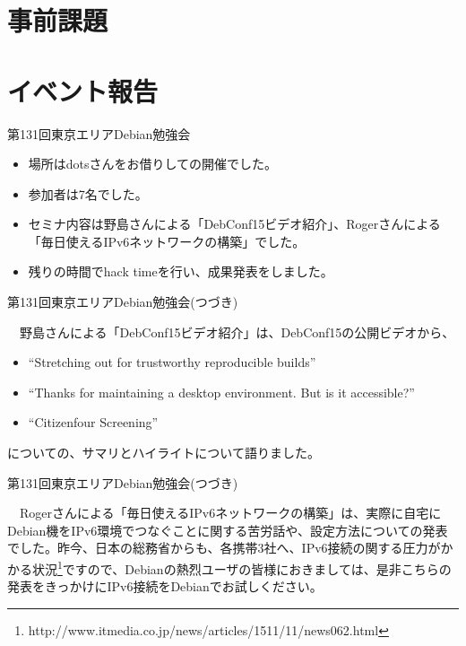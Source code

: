 \section{事前課題}
{\footnotesize
 
}

\section{イベント報告}

\begin{frame}{第131回東京エリアDebian勉強会 }

\begin{itemize}
\item 場所はdotsさんをお借りしての開催でした。
\item 参加者は7名でした。
\item セミナ内容は野島さんによる「DebConf15ビデオ紹介」、Rogerさんによる「毎日使えるIPv6ネットワークの構築」でした。
\item 残りの時間でhack timeを行い、成果発表をしました。
\end{itemize} 
\end{frame}

\begin{frame}{第131回東京エリアDebian勉強会(つづき)}

　野島さんによる「DebConf15ビデオ紹介」は、DebConf15の公開ビデオから、
\begin{itemize}
  \item ``Stretching out for trustworthy reproducible builds''
  \item ``Thanks for maintaining a desktop environment. But is it accessible?''
  \item ``Citizenfour Screening''
\end{itemize}
についての、サマリとハイライトについて語りました。

\end{frame}

\begin{frame}{第131回東京エリアDebian勉強会(つづき)}

 　Rogerさんによる「毎日使えるIPv6ネットワークの構築」は、実際に自宅にDebian機をIPv6環境でつなぐことに関する苦労話や、設定方法についての発表でした。昨今、日本の総務省からも、各携帯3社へ、IPv6接続の関する圧力がかかる状況\footnote{http://www.itmedia.co.jp/news/articles/1511/11/news062.html}ですので、Debianの熱烈ユーザの皆様におきましては、是非こちらの発表をきっかけにIPv6接続をDebianでお試しください。
  
\end{frame}

